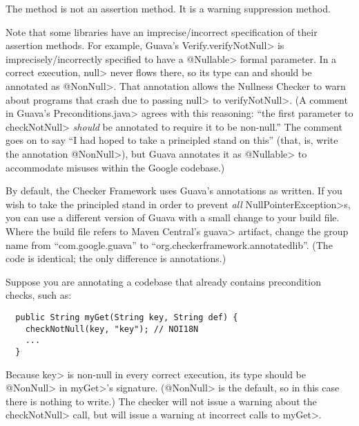 The method
 is not an
assertion method.  It is a warning suppression method.

Note that some libraries have an imprecise/incorrect specification of their assertion
methods.  For example, Guava's \<Verify.verifyNotNull> is imprecisely/incorrectly
specified to have a \<@Nullable> formal parameter.  In a correct execution,
\<null> never flows there, so its type can and should be annotated as
\<@NonNull>.  That annotation allows the Nullness Checker to warn about
programs that crash due to passing \<null> to \<verifyNotNull>.
(A comment in Guava's \<Preconditions.java> agrees with this reasoning:
``the first parameter to \<checkNotNull> \emph{should} be annotated to
require it to be non-null.''  The comment goes on to say ``I had hoped to
take a principled stand on this'' (that, is, write the annotation
\<@NonNull>), but Guava annotates it as \<@Nullable> to accommodate misuses
within the Google codebase.)

By default, the Checker Framework uses Guava's annotations as written.  If
you wish to  take the principled stand in order to prevent \emph{all}
\<NullPointerException>s, you can
use a different version of Guava with a small change to your build file.  Where the
build file refers to Maven Central's \<guava> artifact, change the group
name from ``com.google.guava'' to ``org.checkerframework.annotatedlib''.
(The code is identical; the only difference is annotations.)


Suppose you are annotating a codebase that already contains precondition checks,
such as:

\begin{Verbatim}
  public String myGet(String key, String def) {
    checkNotNull(key, "key"); // NOI18N
    ...
  }
\end{Verbatim}

\noindent
Because \<key> is non-null in every correct execution, its type should be
\<@NonNull> in \<myGet>'s signature.  (\<@NonNull> is the default, so in
this case there is nothing to write.)  The checker will not issue a warning
about the \<checkNotNull> call, but will issue a warning at incorrect calls
to \<myGet>.


